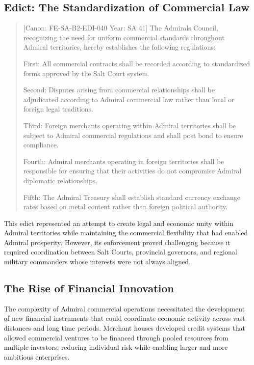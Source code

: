 \subsection{Edict: The Standardization of Commercial
Law}\label{edict-the-standardization-of-commercial-law}

\begin{quote}
{[}Canon: FE-SA-B2-EDI-040 \textbar{} Year: SA 41{]} The
Admiral\textquotesingle s Council, recognizing the need for uniform
commercial standards throughout Admiral territories, hereby establishes
the following regulations:

First: All commercial contracts shall be recorded according to
standardized forms approved by the Salt Court system.

Second: Disputes arising from commercial relationships shall be
adjudicated according to Admiral commercial law rather than local or
foreign legal traditions.

Third: Foreign merchants operating within Admiral territories shall be
subject to Admiral commercial regulations and shall post bond to ensure
compliance.

Fourth: Admiral merchants operating in foreign territories shall be
responsible for ensuring that their activities do not compromise Admiral
diplomatic relationships.

Fifth: The Admiral Treasury shall establish standard currency exchange
rates based on metal content rather than foreign political authority.
\end{quote}

This edict represented an attempt to create legal and economic unity
within Admiral territories while maintaining the commercial flexibility
that had enabled Admiral prosperity. However, its enforcement proved
challenging because it required coordination between Salt Courts,
provincial governors, and regional military commanders whose interests
were not always aligned.

\subsection{The Rise of Financial
Innovation}\label{the-rise-of-financial-innovation}

The complexity of Admiral commercial operations necessitated the
development of new financial instruments that could coordinate economic
activity across vast distances and long time periods. Merchant houses
developed credit systems that allowed commercial ventures to be financed
through pooled resources from multiple investors, reducing individual
risk while enabling larger and more ambitious enterprises.

